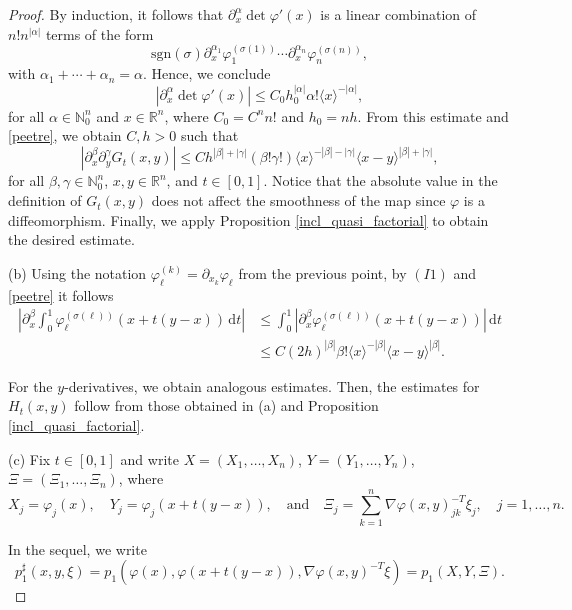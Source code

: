\documentclass[11pt,reqno]{amsart}
\numberwithin{equation}{section}
\begin{document}
\begin{proof}
	By induction, it follows that $\partial_x^\alpha\det\varphi'(x)$ is a linear combination of $n!n^{|\alpha|}$ terms of the form
	\[\mathrm{sgn}(\sigma)\partial_x^{\alpha_1}\varphi_1^{(\sigma(1))}\cdots \partial_x^{\alpha_n}\varphi_n^{(\sigma(n))},\]
	with $\alpha_1+\cdots+\alpha_n=\alpha$. Hence, we conclude
	\[|\partial_x^\alpha\det\varphi'(x)|\leq C_0h_0^{|\alpha|}\alpha!\langle x\rangle^{-|\alpha|},\]
	for all $\alpha\in\mathbb{N}_0^n$ and $x\in\mathbb{R}^n$, where $C_0=C^nn!$ and $h_0=nh$.
	From this estimate and \eqref{peetre}, we obtain $C,h>0$ such that
	\[|\partial_x^\beta\partial_y^\gamma G_t(x,y)|\leq Ch^{|\beta|+|\gamma|}(\beta!\gamma!)\langle x\rangle^{-|\beta|-|\gamma|}\langle x-y\rangle^{|\beta|+|\gamma|},\]
	for all $\beta,\gamma\in\mathbb{N}_0^n$, $x,y\in\mathbb{R}^n$, and $t\in [0,1]$. Notice that the absolute value in the definition of $G_t(x,y)$ does not affect the smoothness of the map since $\varphi$ is a diffeomorphism. Finally, we apply Proposition \ref{incl_quasi_factorial} to obtain the desired estimate.
	
	\medskip\noindent
	(b) Using the notation $\varphi_{\ell}^{(k)}=\partial_{x_k}\varphi_\ell$ from the previous point, by $(I1)$ and \eqref{peetre} it follows
	\begin{align*}
		\left|\partial_x^\beta\int_0^1\varphi_{\ell}^{(\sigma(\ell))}(x+t(y-x))\,\mathrm{d}t\right| & 
		\leq \int_0^1\left|\partial_x^\beta \varphi_{\ell}^{(\sigma(\ell))}(x+t(y-x))\right|\,\mathrm{d}t \\
		& \leq C(2h)^{|\beta|}\beta!\langle x\rangle^{-|\beta|}\langle x-y\rangle^{|\beta|}.
	\end{align*}
	
	For the $y$-derivatives, we obtain analogous estimates. Then, the estimates for $H_t(x,y)$ follow from those obtained in (a) 
	and Proposition \ref{incl_quasi_factorial}.
	
	\medskip\noindent
	(c) Fix $t\in [0,1]$ and write $X=(X_1,\dots,X_n)$, $Y=(Y_1,\dots,Y_n)$, $\Xi=(\Xi_1,\dots,\Xi_n)$, where
	\[X_j=\varphi_j(x),\quad Y_j=\varphi_j(x+t(y-x)),\quad\text{and}\quad \Xi_j=\sum_{k=1}^n \nabla\varphi(x,y)_{jk}^{-T}\xi_j,\quad j=1,\dots,n.\]
	
	In the sequel, we write
	\[
		p_1^\sharp(x,y,\xi)=p_1(\varphi(x),\varphi(x+t(y-x)),\nabla\varphi(x,y)^{-T}\xi)=p_1(X,Y,\Xi).
	\]
	

\end{proof}
\end{document}
